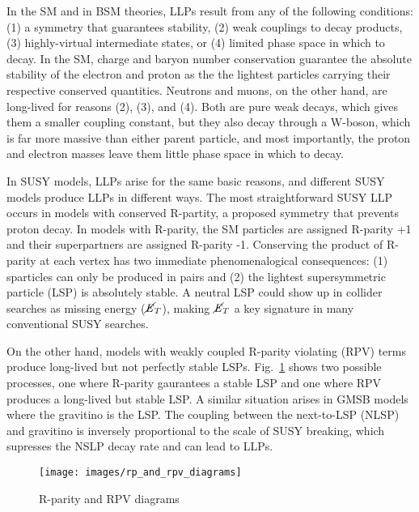 \documentclass[12pt]{article}
\begin{document}
    In the SM and in BSM theories, LLPs result from any of the following conditions: (1) a symmetry that guarantees stability, (2) weak couplings to decay products, (3) highly-virtual intermediate states, or (4) limited phase space in which to decay. In the SM, charge and baryon number conservation guarantee the absolute stability of the electron and proton as the the lightest particles carrying their respective conserved quantities. Neutrons and muons, on the other hand, are long-lived for reasons (2), (3), and (4). Both are pure weak decays, which gives them a smaller coupling constant, but they also decay through a W-boson, which is far more massive than either parent particle, and most importantly, the proton and electron masses leave them little phase space in which to decay.   

    In SUSY models, LLPs arise for the same basic reasons, and different SUSY models produce LLPs in different ways. The most straightforward SUSY LLP occurs in models with conserved R-partity, a proposed symmetry that prevents proton decay. In models with R-parity, the SM particles are assigned R-parity +1 and their superpartners are assigned R-parity -1. Conserving the product of R-parity at each vertex has two immediate phenomenalogical consequences: (1) sparticles can only be produced in pairs and (2) the lightest supersymmetric particle (LSP) is absolutely stable. A neutral LSP could show up in collider searches as missing energy ($\cancel{\it{E}}_{T}$), making $\cancel{\it{E}}_{T}$ a key signature in many conventional SUSY searches.

    On the other hand, models with weakly coupled R-parity violating (RPV) terms produce long-lived but not perfectly stable LSPs. Fig.~\ref{rp_and_rpv_diagrams} shows two possible processes, one where R-parity gaurantees a stable LSP and one where RPV produces a long-lived but stable LSP. A similar situation arises in GMSB models where the gravitino is the LSP. The coupling between the next-to-LSP (NLSP) and gravitino is inversely proportional to the scale of SUSY breaking, which supresses the NSLP decay rate and can lead to LLPs.\fxnote{}  

    \noindent \begin{figure}[htbp] \begin{center}
    \texttt{[image: images/rp\_and\_rpv\_diagrams]}
        \caption{R-parity and RPV diagrams}
    \label{rp_and_rpv_diagrams}
    \end{center} \end{figure}
\end{document}
